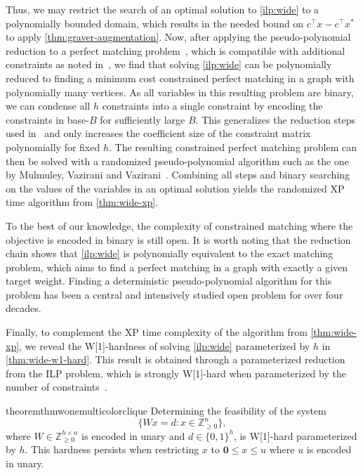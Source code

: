 \documentclass[a4paper,UKenglish,cleveref,thm-restate]{lipics-v2021}
\newcommand{\Z}{\mathbb Z}
\newcommand{\veczero}{\mathbf0}
\begin{document}
Thus, we may restrict the search of an optimal solution to \cref{ilp:wide} to a polynomially bounded domain, which results in the needed bound on $c^\top x-c^\top x^*$ to apply \cref{thm:graver-augmentation}. Now, after applying the pseudo-polynomial reduction to a perfect matching problem~\cite{schrijver2003combinatorial}, which is compatible with additional constraints as noted in~\cite{DBLP:journals/jal/CameriniGM92}, we find that solving \cref{ilp:wide} can be polynomially reduced to finding a minimum cost constrained perfect matching in a graph with polynomially many vertices. As all variables in this resulting problem are binary, we can condense all $h$ constraints into a single constraint by encoding the constraints in base-$B$ for sufficiently large $B$. This generalizes the reduction steps used in~\cite{DBLP:journals/mp/BergerBGS11,DBLP:journals/jacm/PapadimitriouY82} and only increases the coefficient size of the constraint matrix polynomially for fixed $h$. The resulting constrained perfect matching problem can then be solved with a randomized pseudo-polynomial algorithm such as the one by Mulmuley, Vazirani and Vazirani~\cite{DBLP:journals/combinatorica/MulmuleyVV87}. Combining all steps and binary searching on the values of the variables in an optimal solution yields the randomized XP time algorithm from \cref{thm:wide-xp}.

To the best of our knowledge, the complexity of constrained matching where the objective is encoded in binary is still open. It is worth noting that the reduction chain shows that \cref{ilp:wide} is polynomially equivalent to the exact matching problem, which aims to find a perfect matching in a graph with exactly a given target weight. Finding a deterministic pseudo-polynomial algorithm for this problem has been a central and intensively studied open problem for over four decades.

Finally, to complement the XP time complexity of the algorithm from \cref{thm:wide-xp}, we reveal the W[1]-hardness of solving \cref{ilp:wide} parameterized by $h$ in \cref{thm:wide-w1-hard}. This result is obtained through a parameterized reduction from the ILP problem, which is strongly W[1]-hard when parameterized by the number of constraints~\cite{DBLP:journals/ai/DvorakEGKO21}.

\begin{restatable}{theorem}{thmwonemulticolorclique}
    Determining the feasibility of the system
    \[
        \{Wx=d:x\in\Z_{\ge0}^n\},
    \]
    where $W\in\Z_{\ge0}^{h\times n}$ is encoded in unary and $d\in\{0,1\}^h$, is W[1]-hard parameterized by $h$. This hardness persists when restricting $x$ to $\veczero\le x\le u$ where $u$ is encoded in unary.
    \label{thm:w1-multicolorclique}
\end{restatable}
\end{document}
